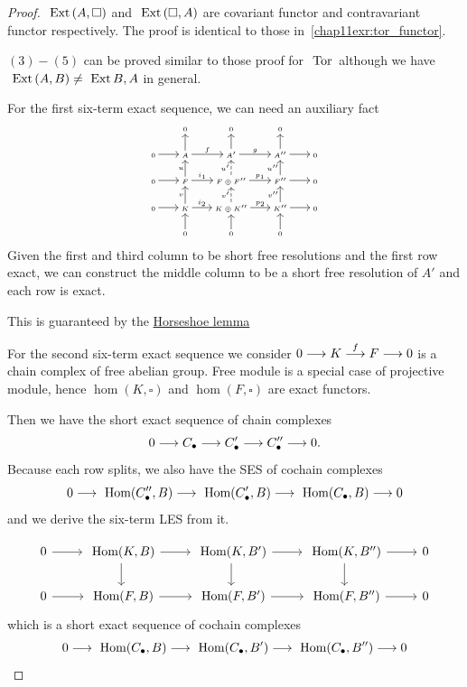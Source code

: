 \documentclass[11pt]{book} %
\begin{document}
\begin{proof}
 $\text{ Ext\,}(A,\square)$ and $\text{ Ext\,}(\square, A)$ are covariant functor and contravariant functor respectively. The proof is identical to those in~\ref{chap11exr:tor_functor}.

 $(3)-(5)$ can be proved similar to those proof for $\text{ Tor\,}$ although we have $\text{ Ext\,}(A, B)\neq \text{ Ext\,} B,A$ in general.

For the first six-term exact sequence, we can
need an auxiliary fact
$$
\tiny
\begin{tikzcd}
 & 0 & 0 & 0 &  \\
0 \arrow[r] & A \arrow[r, "f"] \arrow[u] & A' \arrow[r, "g"] \arrow[u] & A'' \arrow[r] \arrow[u] & 0 \\
0 \arrow[r] & F \arrow[r, "i_1"] \arrow[u, "u"] & F\oplus F'' \arrow[r, "p_1"] \arrow[u, "u'", dashed] & F'' \arrow[r] \arrow[u, "u''"] & 0 \\
0 \arrow[r] & K \arrow[r, "i_2"] \arrow[u, "v"] & K\oplus K'' \arrow[r, "p_2"] \arrow[u, "v'", dashed] & K'' \arrow[r] \arrow[u, "v''"] & 0 \\
 & 0 \arrow[u] & 0 \arrow[u] & 0 \arrow[u] & 
\end{tikzcd}
$$
Given the first and third column to be short free resolutions and the first row exact, we can construct the middle column to be a short free resolution of $A'$ and each row is exact.

This is guaranteed by the \href{https://en.wikipedia.org/wiki/Horseshoe_lemma}{Horseshoe lemma}

 For the second six-term exact sequence we consider
 $0\longrightarrow K\overset{f}{\longrightarrow} F\longrightarrow 0$ is a chain complex of free abelian group. Free module is a special case of projective module, hence $\hom(K,\square)$ and $\hom(F,\square)$ are exact functors. 

 Then we have the 
 short exact sequence of chain complexes
 $$
0\longrightarrow C_\bullet\longrightarrow C'_\bullet\longrightarrow C''_\bullet\longrightarrow 0.
 $$
 Because each row splits, we also have the SES of  cochain complexes
 $$
0\longrightarrow \text{ Hom}(C''_\bullet,B)\longrightarrow\text{ Hom}(C'_\bullet, B)\longrightarrow \text{ Hom}(C_\bullet, B)\longrightarrow 0
 $$
 and we derive the six-term LES from it.

$$
\begin{tikzcd}
0 \arrow[r] & \hom(K, B) \arrow[r] \arrow[d] & \hom(K, B') \arrow[r] \arrow[d] & \hom(K, B'') \arrow[r] \arrow[d] & 0 \\
0 \arrow[r] & \hom(F, B) \arrow[r] & \hom(F, B') \arrow[r] & \hom(F, B'') \arrow[r] & 0
\end{tikzcd}
$$
which is a short exact sequence of cochain complexes
$$
0\longrightarrow \text{ Hom}(C_\bullet, B)\longrightarrow \text{ Hom}(C_\bullet, B')\longrightarrow \text{ Hom}(C_\bullet, B'')\longrightarrow 0
$$


\end{proof}
\end{document}
